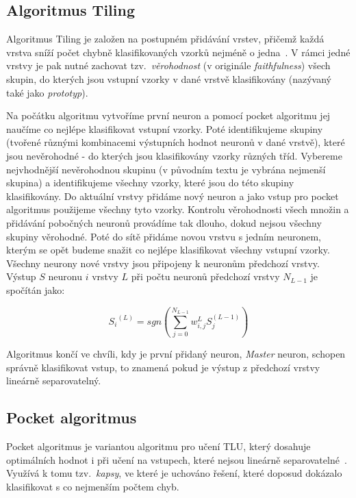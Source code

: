 \documentclass[a4paper, 11pt]{article}
\begin{document}
\subsection*{Algoritmus Tiling}
Algoritmus Tiling je založen na postupném přidávání vrstev, přičemž každá vrstva sníží počet chybně klasifikovaných vzorků nejméně o jedna~\cite{mezard}. V rámci jedné vrstvy je pak nutné zachovat tzv.\ \emph{věrohodnost} (v originále \emph{faithfulness}) všech skupin, do kterých jsou vstupní vzorky v dané vrstvě klasifikovány (nazývaný také jako \emph{prototyp}).

Na počátku algoritmu vytvoříme první neuron a pomocí pocket algoritmu jej naučíme co nejlépe klasifikovat vstupní vzorky. Poté identifikujeme skupiny (tvořené různými kombinacemi výstupních hodnot neuronů v dané vrstvě), které jsou nevěrohodné - do kterých jsou klasifikovány vzorky různých tříd. Vybereme nejvhodnější nevěrohodnou skupinu (v původním textu je vybrána nejmenší skupina) a identifikujeme všechny vzorky, které jsou do této skupiny klasifikovány. Do aktuální vrstvy přidáme nový neuron a jako vstup pro pocket algoritmus použijeme všechny tyto vzorky. Kontrolu vě\-ro\-hod\-nos\-ti všech množin a přidávání pobočných neuronů provádíme tak dlouho, dokud nejsou všechny skupiny věrohodné. Poté do sítě přidáme novou vrstvu s jedním neuronem, kterým se opět budeme snažit co nejlépe klasifikovat všechny vstupní vzorky. Všechny neurony nové vrstvy jsou při\-po\-je\-ny k neuronům předchozí vrstvy. Výstup $S$ neuronu $i$ vrstvy $L$ při počtu neuronů předchozí vrstvy $N_{L-1}$ je spočítán jako:

\begin{equation}
  {S_i}^{(L)}=sgn\left(\sum_{j=0}^{N_{L-1}} w_{i,j}^{L}S_{j}^{(L-1)}\right)
\end{equation}

Algoritmus končí ve chvíli, kdy je první přidaný neuron, \emph{Master} neuron, schopen správně klasifikovat vstup, to znamená pokud je výstup z předchozí vrstvy lineárně separovatelný.

\subsection*{Pocket algoritmus}
Pocket algoritmus je variantou algoritmu pro učení TLU, který dosahuje optimálních hodnot i při učení na vstupech, které nejsou lineárně separovatelné~\cite{ranka}. Využívá k tomu tzv.\ \emph{kapsy}, ve které je uchováno řešení, které doposud dokázalo klasifikovat s co nejmenším počtem chyb.
\end{document}
